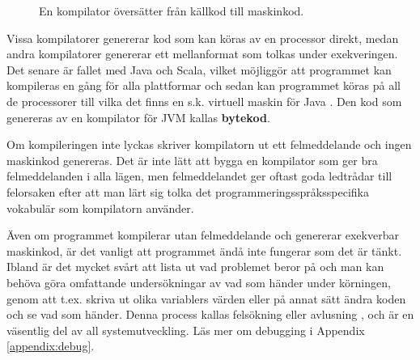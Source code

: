 \begin{figure}[H]
\centering
{}
    \caption{En kompilator översätter från källkod till maskinkod.}
    \label{fig:appendix:compiler}
\end{figure}




Vissa kompilatorer genererar kod som kan köras av en processor direkt, medan andra kompilatorer genererar ett mellanformat som tolkas under exekveringen. Det senare är fallet med Java och Scala, vilket möjliggör att programmet kan kompileras en gång för alla plattformar och sedan kan programmet köras på all de processorer till vilka det finns en s.k. virtuell maskin för Java . Den kod som genereras av en kompilator för JVM kallas \textbf{bytekod}.

Om kompileringen inte lyckas skriver kompilatorn ut ett felmeddelande och ingen maskinkod genereras. Det är inte lätt att bygga en kompilator som ger bra felmeddelanden i alla lägen, men felmeddelandet ger oftast goda ledtrådar till felorsaken efter att man lärt sig tolka det programmeringsspråksspecifika vokabulär som kompilatorn använder.

Även om programmet kompilerar utan felmeddelande och genererar exekverbar maskinkod, är det vanligt att programmet ändå inte fungerar som det är tänkt. Ibland är det mycket svårt att lista ut vad problemet beror på och man kan behöva göra omfattande undersökningar av vad som händer under körningen, genom att t.ex. skriva ut olika variablers värden eller på annat sätt ändra koden och se vad som händer. Denna process kallas felsökning eller avlusning , och är en väsentlig del av all systemutveckling. Läs mer om debugging i Appendix \ref{appendix:debug}.

